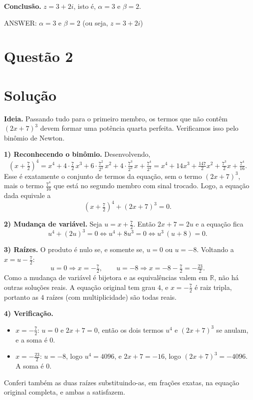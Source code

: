 \documentclass{article}%
\begin{document}
\medskip
\textbf{Conclusão.} $z=3+2i$, isto é, $\alpha=3$ e $\beta=2$.

ANSWER: $\alpha=3$ e $\beta=2$ (ou seja, $z=3+2i$)%
\newpage%
\section*{Questão 2}

\section*{Solução}

\textbf{Ideia.} Passando tudo para o primeiro membro, os termos que não contêm $(2x+7)^3$ devem formar uma potência quarta perfeita. Verificamos isso pelo binômio de Newton.

\textbf{1) Reconhecendo o binômio.} Desenvolvendo,
\[
\left(x+\tfrac{7}{2}\right)^4 = x^4+4\cdot\tfrac{7}{2}\,x^3+6\cdot\tfrac{7^2}{2^2}\,x^2+4\cdot\tfrac{7^3}{2^3}\,x+\tfrac{7^4}{2^4}
= x^4+14x^3+\tfrac{147}{2}x^2+\tfrac{7^3}{2}x+\tfrac{7^4}{16}.
\]
Esse é exatamente o conjunto de termos da equação, sem o termo $(2x+7)^3$, mais o termo $\tfrac{7^4}{16}$ que está no segundo membro com sinal trocado. Logo, a equação dada equivale a
\[
\left(x+\tfrac{7}{2}\right)^4+(2x+7)^3=0 .
\]

\textbf{2) Mudança de variável.} Seja $u=x+\tfrac{7}{2}$. Então $2x+7=2u$ e a equação fica
\[
u^4+(2u)^3=0 \iff u^4+8u^3=0 \iff u^3\,(u+8)=0 .
\]

\textbf{3) Raízes.} O produto é nulo se, e somente se, $u=0$ ou $u=-8$. Voltando a $x=u-\tfrac{7}{2}$:
\[
u=0 \Rightarrow x=-\tfrac{7}{2}, \qquad u=-8 \Rightarrow x=-8-\tfrac{7}{2}=-\tfrac{23}{2}.
\]
Como a mudança de variável é bijetora e as equivalências valem em $\mathbb{R}$, não há outras soluções reais. A equação original tem grau $4$, e $x=-\tfrac72$ é raiz tripla, portanto as $4$ raízes (com multiplicidade) são todas reais.

\textbf{4) Verificação.}
\begin{itemize}
\item $x=-\tfrac{7}{2}$: $u=0$ e $2x+7=0$, então os dois termos $u^4$ e $(2x+7)^3$ se anulam, e a soma é $0$.
\item $x=-\tfrac{23}{2}$: $u=-8$, logo $u^4=4096$, e $2x+7=-16$, logo $(2x+7)^3=-4096$. A soma é $0$.
\end{itemize}
Conferi também as duas raízes substituindo-as, em frações exatas, na equação original completa, e ambas a satisfazem.
\end{document}
